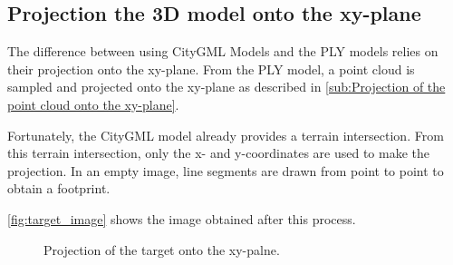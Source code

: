         \subsection{Projection the 3D model onto the xy-plane}
            The difference between using CityGML Models and the PLY models relies on their projection onto the xy-plane.
            From the PLY model, a point cloud is sampled and projected onto the xy-plane as described in \autoref{sub:Projection of the point cloud onto the xy-plane}.

            Fortunately, the CityGML model already provides a terrain intersection.
            From this terrain intersection, only the x- and y-coordinates are used to make the projection.
            In an empty image, line segments are drawn from point to point to obtain a footprint.

            \autoref{fig:target_image} shows the image obtained after this process.

            \begin{figure}[htp]
                \centering
                \caption{Projection of the target onto the xy-palne.}
                \label{fig:target_image}
            \end{figure}
